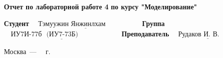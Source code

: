 \begin{titlepage}
    \begin{center}
        \Large\textbf{\hspace{1cm} Отчет по лабораторной работе 4} 
        \newline
        \Large\textbf{по курсу "Моделирование"}

    \end{center}
    \newline
    \noindent\textbf{Студент} $\underline{\text{~~~Тэмуужин Янжинлхам~~~~~~~~~~~~~~~}}$\newline\newline
    \noindent\textbf{Группа} $\underline{\text{~~~ИУ7И-77б~~(ИУ7-73Б)~~~~~~~~~~~~~~~~~~}}$\newline\newline
    \noindent\textbf{Преподаватель} $\underline{\text{~~~Рудаков И. В.~~~~~~~~~~~}}$\newline

    \begin{center}
        \vfill
        Москва~---~\the\year
        ~г.
    \end{center}
    \restoregeometry
\end{titlepage}
